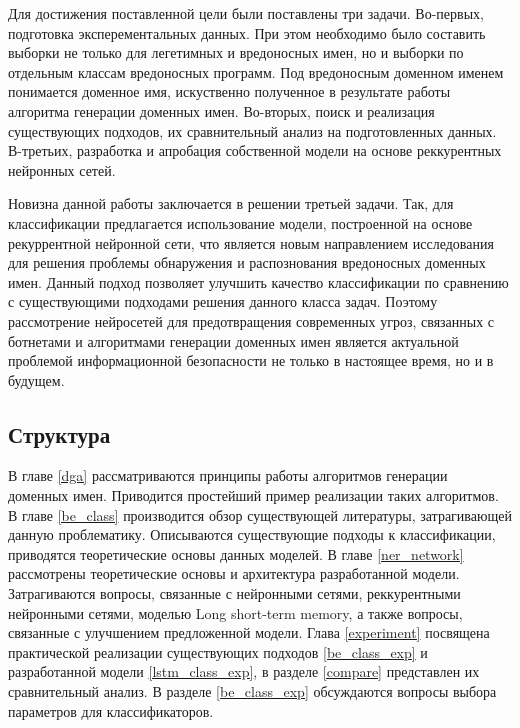 Для достижения поставленной цели были поставлены три задачи. Во-первых, подготовка эксперементальных данных. При этом необходимо было составить выборки не только для легетимных и вредоносных имен, но и выборки по отдельным классам вредоносных программ. Под вредоносным доменном именем понимается доменное имя, искуственно полученное в результате работы алгоритма генерации доменных имен. Во-вторых, поиск и реализация существующих подходов, их сравнительный анализ на подготовленных данных. В-третьих, разработка и апробация собственной модели на основе реккурентных нейронных сетей.

Новизна данной работы заключается в решении третьей задачи. Так, для классификации предлагается использование модели, построенной на основе рекуррентной нейронной сети, что является новым направлением исследования для решения проблемы обнаружения и распознования вредоносных доменных имен. Данный подход позволяет улучшить качество классификации по сравнению с существующими подходами решения данного класса задач. Поэтому рассмотрение нейросетей для предотвращения современных угроз, связанных с ботнетами и алгоритмами генерации доменных имен является актуальной проблемой информационной безопасности не только в настоящее время, но и в будущем.
\subsection{Структура}
В главе \ref{dga} рассматриваются принципы работы алгоритмов генерации доменных имен. Приводится простейший пример реализации таких алгоритмов.
В главе \ref{be_class} производится обзор существующей литературы, затрагивающей данную проблематику. Описываются существующие подходы к классификации, приводятся теоретические основы данных моделей.
В главе \ref{ner_network} рассмотрены теоретические основы и архитектура разработанной модели. Затрагиваются вопросы, связанные с нейронными сетями, реккурентными нейронными сетями, моделью Long short-term memory, а также вопросы, связанные с улучшением предложенной модели.
Глава \ref{experiment} посвящена практической реализации существующих подходов \ref{be_class_exp} и разработанной модели \ref{lstm_class_exp}, в разделе \ref{compare} представлен их сравнительный анализ.
В разделе \ref{be_class_exp} обсуждаются вопросы выбора параметров для классификаторов.
\clearpage